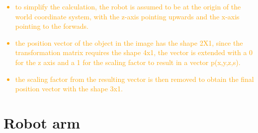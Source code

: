 

      
      
    
    



\textcolor{orange}{
\begin{itemize}
    \item to simplify the calculation, the robot is assumed to be at the origin of the world coordinate system, with the z-axis pointing upwards and the x-axis pointing to the forwads.  
    \item the position vector of the object in the image has the shape 2X1, since the transformation matrix requires the shape 4x1, the vector is extended with a 0 for the z axis and a 1 for the scaling factor to result in a vector p(x,y,z,s).  
    \item the scaling factor from the resulting vector is then removed to obtain the final position vector with the shape 3x1.  
\end{itemize}
} %


\section{Robot arm}

